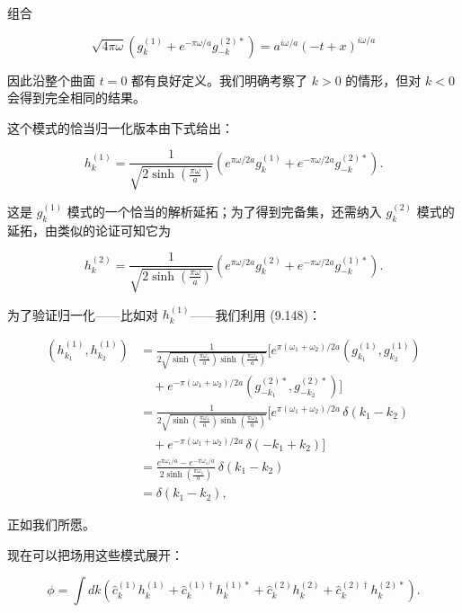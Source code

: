 组合

\begin{equation*}
\sqrt{4\pi\omega}\left(g_{k}^{(1)} + e^{-\pi\omega/a}g_{-k}^{(2)*}\right) = a^{i\omega/a}(-t+x)^{i\omega/a}
\tag{9.155}
\end{equation*}

因此沿整个曲面 $t=0$ 都有良好定义。我们明确考察了 $k>0$ 的情形，但对 $k<0$ 会得到完全相同的结果。

这个模式的恰当归一化版本由下式给出：

\begin{equation*}
h_{k}^{(1)} = \frac{1}{\sqrt{2\sinh\left(\frac{\pi\omega}{a}\right)}}\left(e^{\pi\omega/2a}g_{k}^{(1)} + e^{-\pi\omega/2a}g_{-k}^{(2)*}\right).
\tag{9.156}
\end{equation*}

这是 $g_{k}^{(1)}$ 模式的一个恰当的解析延拓；为了得到完备集，还需纳入 $g_{k}^{(2)}$ 模式的延拓，由类似的论证可知它为

\begin{equation*}
h_{k}^{(2)} = \frac{1}{\sqrt{2\sinh\left(\frac{\pi\omega}{a}\right)}}\left(e^{\pi\omega/2a}g_{k}^{(2)} + e^{-\pi\omega/2a}g_{-k}^{(1)*}\right).
\tag{9.157}
\end{equation*}

为了验证归一化——比如对 $h_{k}^{(1)}$——我们利用 (9.148)：

\begin{align*}
\left(h_{k_1}^{(1)}, h_{k_2}^{(1)}\right) &= \frac{1}{2\sqrt{\sinh\left(\frac{\pi\omega_1}{a}\right)\sinh\left(\frac{\pi\omega_2}{a}\right)}}\Bigg[e^{\pi(\omega_1+\omega_2)/2a}\left(g_{k_1}^{(1)}, g_{k_2}^{(1)}\right) \\
&\quad + e^{-\pi(\omega_1+\omega_2)/2a}\left(g_{-k_1}^{(2)*}, g_{-k_2}^{(2)*}\right)\Bigg] \\
&= \frac{1}{2\sqrt{\sinh\left(\frac{\pi\omega_1}{a}\right)\sinh\left(\frac{\pi\omega_2}{a}\right)}}\Bigg[e^{\pi(\omega_1+\omega_2)/2a}\,\delta(k_1 - k_2) \\
&\quad + e^{-\pi(\omega_1+\omega_2)/2a}\,\delta(-k_1 + k_2)\Bigg] \\
&= \frac{e^{\pi\omega_1/a} - e^{-\pi\omega_1/a}}{2\sinh\left(\frac{\pi\omega_1}{a}\right)}\,\delta(k_1 - k_2) \\
&= \delta(k_1 - k_2),
\tag{9.158}
\end{align*}

正如我们所愿。

现在可以把场用这些模式展开：

\begin{equation*}
\phi = \int dk\left(\hat{c}_{k}^{(1)}h_{k}^{(1)} + \hat{c}_{k}^{(1)\dagger}h_{k}^{(1)*} + \hat{c}_{k}^{(2)}h_{k}^{(2)} + \hat{c}_{k}^{(2)\dagger}h_{k}^{(2)*}\right).
\tag{9.159}
\end{equation*}

